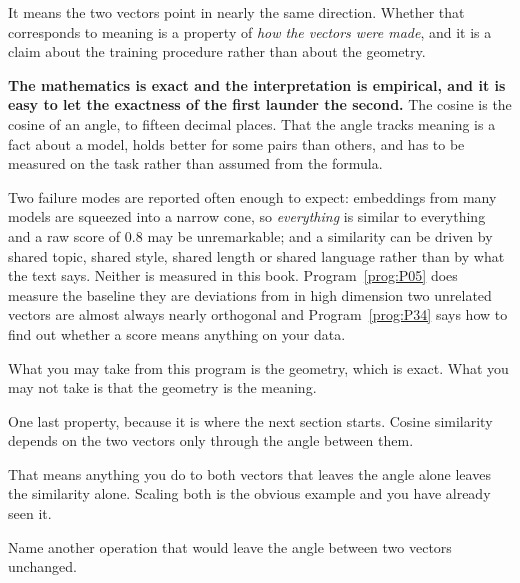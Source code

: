 \begin{fr}
It means the two vectors point in nearly the same direction. Whether that
corresponds to meaning is a property of \emph{how the vectors were made}, and
it is a claim about the training procedure rather than about the geometry.

\begin{trapbox}
\textbf{The mathematics is exact and the interpretation is empirical, and it
is easy to let the exactness of the first launder the second.} The cosine is
the cosine of an angle, to fifteen decimal places. That the angle tracks
meaning is a fact about a model, holds better for some pairs than others, and
has to be measured on the task rather than assumed from the formula.

Two failure modes are reported often enough to expect: embeddings from many
models are squeezed into a narrow cone, so \emph{everything} is similar to
everything and a raw score of $\num{0.8}$ may be unremarkable; and a
similarity can be driven by shared topic, shared style, shared length or
shared language rather than by what the text says. Neither is measured in this
book. Program~\ref{prog:P05} does measure the baseline they are deviations
from \dash{} in high dimension two unrelated vectors are almost always nearly
orthogonal \dash{} and Program~\ref{prog:P34} says how to find out whether a
score means anything on your data.

What you may take from this program is the geometry, which is exact. What you
may not take is that the geometry is the meaning.
\end{trapbox}
\end{fr}


\begin{fr}
One last property, because it is where the next section starts. Cosine
similarity depends on the two vectors only through the angle between them.

That means anything you do to both vectors that leaves the angle alone leaves
the similarity alone. Scaling both is the obvious example and you have already
seen it.

Name another operation that would leave the angle between two vectors
unchanged.
\nextframe
\end{fr}

